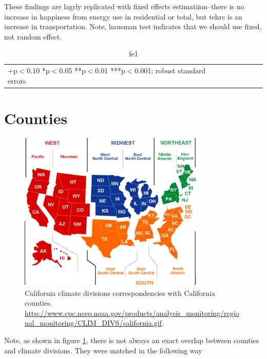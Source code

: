 \documentclass[10pt, letterpaper]{article}
\begin{document}
\begin{spacing}{1.4}
These findings are lagrly replicated with fixed effects estimatiion--there is no
increase in happiness from energy use in residential or total, but tehre is an
increase in transportation. Note, hausman test indicates that we should use
fixed, not random effect.  


\begin{table}[H]\centering \caption{fe1} \label{fe1} \begin{scriptsize} \begin{tabular}{p{1.4in}p{.43in}p{.43in}p{.43in}p{.43in}p{.43in}p{.43in}p{.43in}p{.43in}p{.43in}p{.43 in}p{.43in}p{.43 in}}\hline  \hline\multicolumn{6}{l}{+p$<$0.10 *p$<$0.05 **p$<$0.01 ***p$<$0.001; robust standard errors} \end{tabular}\end{scriptsize}\end{table}



\section{Counties}

\begin{figure}[H]
 \includegraphics[height=3in]{graphsAndTables/cendivco.pdf}\centering
\caption{California climate divisions correspondencies with California
  counties. \url{http://www.cpc.ncep.noaa.gov/products/analysis_monitoring/regional_monitoring/CLIM_DIVS/california.gif}.}\label{caCD}
\end{figure}

Note, as shown in figure \ref{caCD}, there is not always an exact overlap
between counties and climate divisions. They were matched in the following way


\end{spacing}
\end{document}
